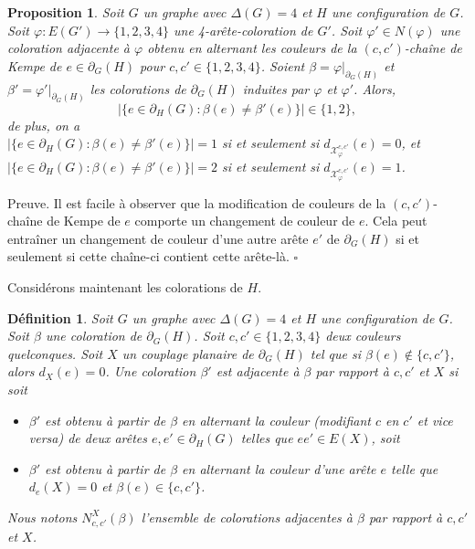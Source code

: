 \documentclass[10pt,a4paper]{article}
\newtheorem{definition}{Définition}
\newtheorem{proposition}{Proposition}
\newcommand{\ep}{{\hfill $\square$}}
\begin{document}
\begin{proposition}
Soit $G$ un graphe avec $\Delta(G)=4$ et $H$ une configuration de $G$.
Soit $\varphi:E(G')\to \{1,2,3,4\}$ une 4-arête-coloration de $G'$. 
Soit $\varphi' \in N(\varphi)$ une coloration adjacente à $\varphi$ obtenu en alternant les couleurs de la $(c,c')$-chaîne de Kempe de $e\in \partial_G(H)$ pour $c,c'\in\{1,2,3,4\}$.
Soient $\beta = \varphi|_{\partial_G(H)}$ et $\beta' = \varphi'|_{\partial_G(H)}$ les colorations de  $\partial_G(H)$ induites par $\varphi$ et $\varphi'$. Alors,
$$
|\{e\in \partial_H(G) : \beta(e)\ne \beta'(e)\}| \in \{1,2\},
$$
de plus, on a \\
$|\{e\in \partial_H(G) : \beta(e)\ne \beta'(e)\}|=1$ si et seulement si $d_{\mathcal{X}_{\varphi}^{c,c'}}(e)=0$, et \\
$|\{e\in \partial_H(G) : \beta(e)\ne \beta'(e)\}|=2$ si et seulement si $d_{\mathcal{X}_{\varphi}^{c,c'}}(e)=1$. 
\end{proposition}

Preuve. Il est facile à observer que la modification de couleurs de la $(c,c')$-chaîne de Kempe de $e$ comporte un changement de couleur de $e$. Cela peut entraîner un changement de couleur d'une autre arête $e'$  de $\partial_G(H)$ si et seulement si cette chaîne-ci contient cette arête-là. \ep


Considérons maintenant les colorations de $H$.
  
\begin{definition}
Soit $G$ un graphe avec $\Delta(G)=4$ et $H$ une configuration de $G$.
Soit $\beta$ une coloration de $\partial_G(H)$. Soit $c,c'\in \{1,2,3,4\}$ deux couleurs quelconques. Soit $X$ un couplage planaire de $\partial_G(H)$ tel que si $\beta(e)\notin \{c,c'\}$, alors $d_X(e)=0$. Une coloration $\beta'$ est \emph{adjacente} à $\beta$ par rapport à $c,c'$ et $X$ si soit
\begin{itemize}
\item $\beta'$ est obtenu à partir de $\beta$ en alternant la couleur (modifiant $c$ en $c'$ et vice versa) de deux arêtes $e,e'\in \partial_H(G)$ telles que $ee'\in E(X)$, soit
\item $\beta'$ est obtenu à partir de $\beta$ en alternant la couleur d'une arête $e$ telle que $d_e(X)=0$ et $\beta(e)\in\{c,c'\}$.
\end{itemize}
Nous notons $N^X_{c,c'}(\beta)$ l'ensemble de colorations adjacentes à $\beta$ par rapport à $c,c'$ et $X$.
\end{definition}
\end{document}
